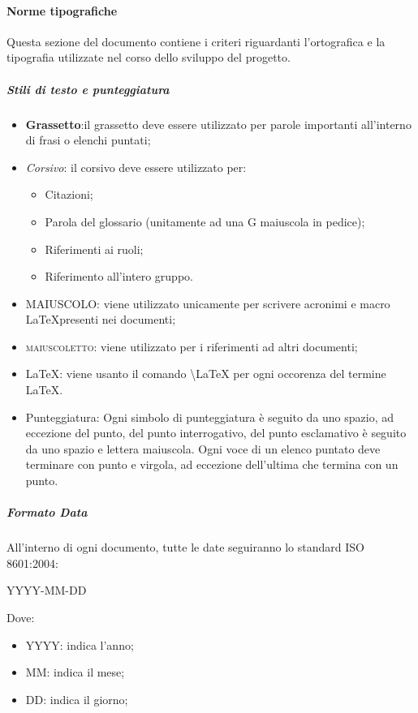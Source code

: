 		\paragraph{Norme tipografiche}
			Questa sezione del documento contiene i criteri riguardanti l’ortografica e la tipografia utilizzate nel corso dello sviluppo del progetto.
			\subparagraph{Stili di testo e punteggiatura}
				\begin{itemize}
					\item \textbf{Grassetto}:il grassetto deve essere utilizzato per parole importanti all’interno di frasi o elenchi puntati;
					\item \textit{Corsivo}: il corsivo deve essere utilizzato per:
						\begin{itemize}
							\item Citazioni;
							\item Parola del glossario (unitamente ad una G maiuscola in pedice);
							\item Riferimenti ai ruoli;
							\item Riferimento all’intero gruppo.
						\end{itemize}
					\item MAIUSCOLO: viene utilizzato unicamente per scrivere acronimi e macro \LaTeX presenti nei documenti;
					\item \textsc{maiuscoletto}: viene utilizzato per i riferimenti ad altri documenti;
					\item \LaTeX: viene usanto il comando \textbackslash{LaTeX} per ogni occorenza del termine \LaTeX.
					\item Punteggiatura: Ogni simbolo di punteggiatura è seguito da uno spazio, ad eccezione del punto, del punto interrogativo, del punto esclamativo è seguito da uno spazio e lettera maiuscola. Ogni voce di un elenco puntato deve terminare con punto e virgola, ad eccezione dell’ultima che termina con un punto. 
				\end{itemize}
			\subparagraph{Formato Data}
				All’interno di ogni documento, tutte le date seguiranno lo standard ISO\ped{G} 8601:2004:
					\begin{center}
						YYYY-MM-DD
					\end{center}
				Dove:
					\begin{itemize}
						\item YYYY: indica l’anno;
						\item MM: indica il mese;
						\item DD: indica il giorno;
					\end{itemize}
		
